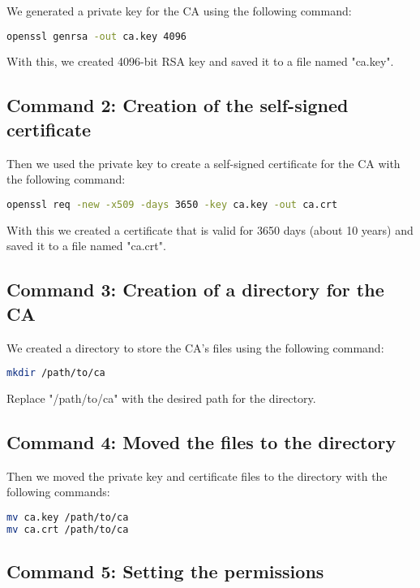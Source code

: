 \documentclass[12pt]{article}
\begin{document}
We generated a private key for the CA using the following command:

\begin{lstlisting}[language=bash]
openssl genrsa -out ca.key 4096
\end{lstlisting}

With this, we created 4096-bit RSA key and saved it to a file named "ca.key".

\subsection{Command 2: Creation of the self-signed certificate}

Then we used the private key to create a self-signed certificate for the CA with the following command:

\begin{lstlisting}[language=bash]
openssl req -new -x509 -days 3650 -key ca.key -out ca.crt
\end{lstlisting}

With this we created a certificate that is valid for 3650 days (about 10 years) and saved it to a file named "ca.crt".

\subsection{Command 3: Creation of a directory for the CA}

We created a directory to store the CA's files using the following command:

\begin{lstlisting}[language=bash]
mkdir /path/to/ca
\end{lstlisting}

Replace "/path/to/ca" with the desired path for the directory.

\subsection{Command 4: Moved the files to the directory}

Then we moved the private key and certificate files to the directory with the following commands:

\begin{lstlisting}[language=bash]
mv ca.key /path/to/ca
mv ca.crt /path/to/ca
\end{lstlisting}

\subsection{Command 5: Setting the permissions}
\end{document}
